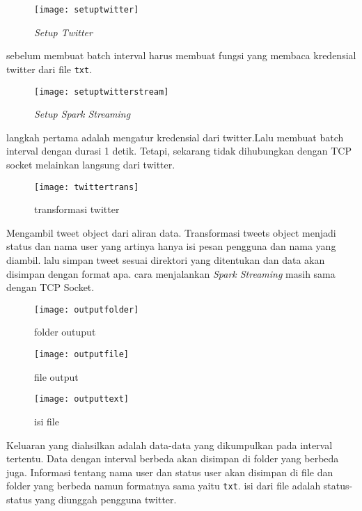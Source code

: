 \begin{figure}[H] 
	\centering  
	\texttt{[image: setuptwitter]}  
	\caption[Gambar Setup Twitter]{\textit{Setup Twitter}} 
	\label{fig:Output-Twitter} 
\end{figure}

sebelum membuat batch interval harus membuat fungsi yang membaca kredensial twitter dari file \texttt{txt}.

\begin{figure}[H] 
	\centering  
	\texttt{[image: setuptwitterstream]}  
	\caption[Gambar Setup Spark Streaming]{\textit{Setup Spark Streaming}} 
	\label{fig:Output-Twitter} 
\end{figure}

langkah pertama adalah mengatur kredensial dari twitter.Lalu membuat batch interval dengan durasi 1 detik. Tetapi, sekarang tidak dihubungkan dengan TCP socket melainkan langsung dari twitter.

\begin{figure}[H] 
	\centering  
	\texttt{[image: twittertrans]}  
	\caption[Gambar transformasi twitter]{transformasi twitter} 
	\label{fig:Output-Twitter} 
\end{figure}

Mengambil tweet object dari aliran data. Transformasi tweets object menjadi status  dan nama user yang artinya hanya isi pesan pengguna dan nama yang diambil. lalu simpan tweet sesuai direktori yang ditentukan dan data akan disimpan dengan format apa. cara menjalankan \textit{Spark Streaming} masih sama dengan TCP Socket.

\begin{figure}[H] 
	\centering  
	\texttt{[image: outputfolder]}  
	\caption[Gambar folder output]{folder outuput} 
	\label{fig:Output-Twitter} 
\end{figure}

\begin{figure}[H] 
	\centering  
	\texttt{[image: outputfile]}  
	\caption[Gambar file output]{file output} 
	\label{fig:Output-Twitter} 
\end{figure}

\begin{figure}[H] 
	\centering  
	\texttt{[image: outputtext]}  
	\caption[Gambar file output]{isi file} 
	\label{fig:Output-Twitter} 
\end{figure}

Keluaran yang diahsilkan adalah data-data yang dikumpulkan pada interval tertentu. Data dengan interval berbeda akan disimpan di folder yang berbeda juga. Informasi tentang nama user dan status user akan disimpan di file dan folder yang berbeda namun formatnya sama yaitu \texttt{txt}. isi dari file adalah status-status yang diunggah pengguna twitter.

 


 